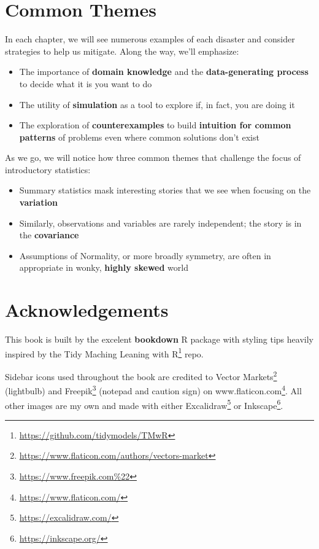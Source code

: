 \documentclass[
]{krantz}
\providecommand{\tightlist}{%
  \setlength{\itemsep}{0pt}\setlength{\parskip}{0pt}}
\renewcommand{\href}[2]{#2\footnote{\url{#1}}}
\begin{document}
\hypertarget{common-themes}{%
\section{Common Themes}\label{common-themes}}

In each chapter, we will see numerous examples of each disaster and consider strategies to help us mitigate.
Along the way, we'll emphasize:

\begin{itemize}
\tightlist
\item
  The importance of \textbf{domain knowledge} and the \textbf{data-generating process} to decide what it is you want to do
\item
  The utility of \textbf{simulation} as a tool to explore if, in fact, you are doing it
\item
  The exploration of \textbf{counterexamples} to build \textbf{intuition for common patterns} of problems even where common solutions don't exist
\end{itemize}

As we go, we will notice how three common themes that challenge the focus of introductory statistics:

\begin{itemize}
\tightlist
\item
  Summary statistics mask interesting stories that we see when focusing on the \textbf{variation}
\item
  Similarly, observations and variables are rarely independent; the story is in the \textbf{covariance}
\item
  Assumptions of Normality, or more broadly symmetry, are often in appropriate in wonky, \textbf{highly skewed} world
\end{itemize}

\hypertarget{acknowledgements}{%
\section{Acknowledgements}\label{acknowledgements}}

This book is built by the excelent \textbf{bookdown} R package with styling tips heavily inspired by the \href{https://github.com/tidymodels/TMwR}{Tidy Maching Leaning with R} repo.

Sidebar icons used throughout the book are credited to \href{https://www.flaticon.com/authors/vectors-market}{Vector Markets} (lightbulb) and \href{https://www.freepik.com\%22}{Freepik} (notepad and caution sign) on \href{https://www.flaticon.com/}{www.flaticon.com}. All other images are my own and made with either \href{https://excalidraw.com/}{Excalidraw} or \href{https://inkscape.org/}{Inkscape}.
\end{document}
